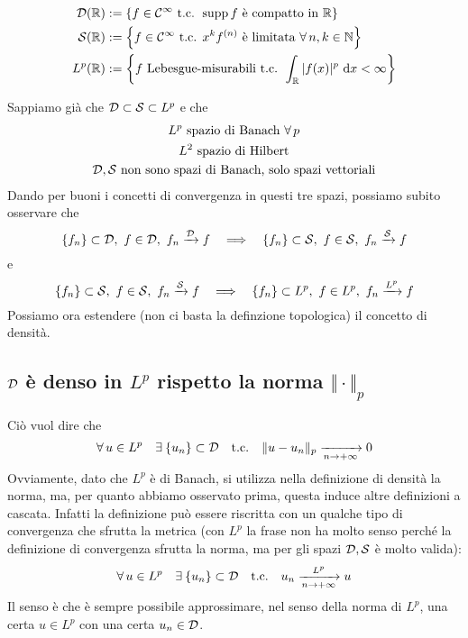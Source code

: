 \begin{align*}
\Dc(\RR)&:=\left\{f\in\Cc^\infty\text{ t.c. }\supp f \text{ è compatto in }\RR\right\} \\
\Sc(\RR)&:=\left\{f\in\Cc^{\infty}\text{ t.c. }x^kf^{(n)}\text{ è limitata }\forall n,k\in\NN\right\} \\
L^{p}(\RR)&:=\left\{f\text{ Lebesgue-misurabili t.c. }\int_{\RR}|f(x)|^{p} \dx < \infty \right\}
\end{align*}

Sappiamo già che $\mathcal{D}\subset\mathcal{S}\subset L^p$
e che 
\begin{gather*}
L^p\text{ spazio di Banach }\forall p \\
L^2\text{ spazio di Hilbert} \\
\Dc,\Sc\text{ non sono spazi di Banach, solo spazi vettoriali}
\end{gather*}
Dando per buoni i concetti di convergenza in questi tre spazi, possiamo subito osservare che
\begin{equation}
\label{dens_uno}
\{f_n\}\subset\Dc,\ f\in\Dc,\ f_n\xrightarrow[]{\Dc}f\quad\Longrightarrow\quad \{f_n\}\subset\Sc,\ f\in\Sc,\ f_n\xrightarrow[]{\Sc}f
\end{equation}
e
\begin{equation}
\label{dens_due}
\{f_n\}\subset\Sc,\ f\in\Sc,\ f_n\xrightarrow[]{\Sc}f\quad\Longrightarrow\quad \{f_n\}\subset L^p,\ f\in L^p,\ f_n\xrightarrow[]{L^p}f
\end{equation}
Possiamo ora estendere (non ci basta la definzione topologica) il concetto di densità.

\subsection{\texorpdfstring{$\mathcal{D}$}{C} è denso in \texorpdfstring{$L^p$}{C} rispetto la norma \texorpdfstring{$\Vert\cdot\Vert_p$}{C}}

Ciò vuol dire che
\begin{equation*}
\forall u\in L^p\quad\exists\{u_n\}\subset\Dc\quad\text{t.c.}\quad \Vert u-u_n\Vert_p \xrightarrow[n\to+\infty]{} 0
\end{equation*}
Ovviamente, dato che $L^p$ è di Banach, si utilizza nella definizione di densità la norma, ma, per quanto abbiamo osservato prima, questa induce altre definizioni a cascata. Infatti la definizione può essere riscritta con un qualche tipo di convergenza che sfrutta la metrica (con $L^p$ la frase non ha molto senso perché la definizione di convergenza sfrutta la norma, ma per gli spazi $\mathcal{D},\mathcal{S}$ è molto valida):
\begin{equation*}
\forall u\in L^p\quad\exists\{u_n\}\subset\Dc\quad\text{t.c.}\quad u_n\xrightarrow[n\to+\infty]{L^p}u
\end{equation*}
Il senso è che è sempre possibile approssimare, nel senso della norma di $L^p$, una certa $u\in L^p$ con una certa $u_n\in\mathcal{D}$.

